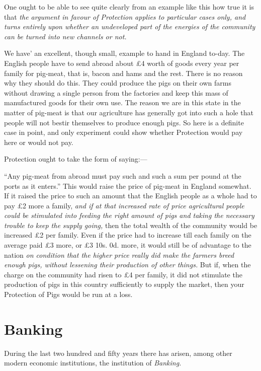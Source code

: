 \documentclass{book}
\begin{document}
One ought to be able to see quite clearly from an example like this how true it is that \emph{the argument in favour of Protection applies to particular cases only, and turns entirely upon whether an undeveloped part of the energies of the community can be turned into new channels or not.}

We have’ an excellent, though small, example to hand in England to-day. The English people have to send abroad about £4 worth of goods every year per family for pig-meat, that is, bacon and hams and the rest. There is no reason why they should do this. They could produce the pigs on their own farms without drawing a single person from the factories and keep this mass of manufactured goods for their own use. The reason we are in this state in the matter of pig-meat is that our agriculture has generally got into such a hole that people will not bestir themselves to produce enough pigs. So here is a definite case in point, and only experiment could show whether Protection would pay here or would not pay.

Protection ought to take the form of saying:—

“Any pig-meat from abroad must pay such and such a sum per pound at the ports as it enters.” This would raise the price of pig-meat in England somewhat. If it raised the price to such an amount that the English people as a whole had to pay £2 more a family, \emph{and if at that increased rate of price agricultural people could be stimulated into feeding the right amount of pigs and taking the necessary trouble to keep the supply going,} then the total wealth of the community would be increased £2 per family. Even if the price had to increase till each family on the average paid £3 more, or £3 10s. 0d. more, it would still be of advantage to the nation \emph{on condition that the higher price really did make the farmers breed enough pigs, without lessening their production of other things.} But if, when the charge on the community had risen to £4 per family, it did not stimulate the production of pigs in this country sufficiently to supply the market, then your Protection of Pigs would be run at a loss.

\chapter*{Banking}
\label{chapter-17}
During the last two hundred and fifty years there has arisen, among other modern economic institutions, the institution of \emph{Banking.}
\end{document}
